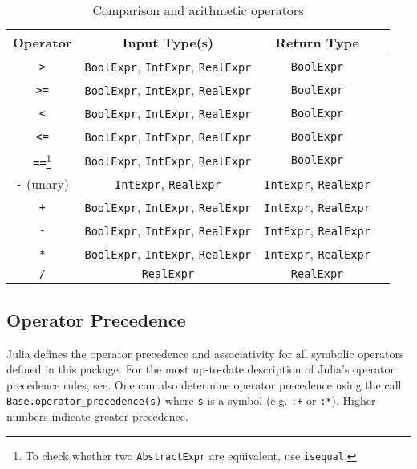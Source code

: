 \documentclass[conference]{IEEEtran}
\begin{document}
\begin{table}[h!]
	\centering
	\begin{tabular}{|c|c|c|c|}
	\hline
	Operator & Input Type(s) & Return Type\\
	\hline
	\verb|>| & \verb|BoolExpr|, \verb|IntExpr|, \verb|RealExpr|& \verb|BoolExpr| \\
	\hline
	\verb|>=| & \verb|BoolExpr|, \verb|IntExpr|, \verb|RealExpr|& \verb|BoolExpr| \\
	\hline
	\verb|<| & \verb|BoolExpr|, \verb|IntExpr|, \verb|RealExpr|& \verb|BoolExpr| \\
	\hline
	\verb|<=| & \verb|BoolExpr|, \verb|IntExpr|, \verb|RealExpr|& \verb|BoolExpr| \\
	\hline
	\verb|==|\footnote{To check whether two \texttt{AbstractExpr} are equivalent, use \texttt{isequal}.}
	& \verb|BoolExpr|, \verb|IntExpr|, \verb|RealExpr|& \verb|BoolExpr| \\
	\hline
	\verb|-| (unary) & \verb|IntExpr|, \verb|RealExpr| & \verb|IntExpr|, \verb|RealExpr|\\
	\hline
	\verb|+| & \verb|BoolExpr|, \verb|IntExpr|, \verb|RealExpr|& \verb|IntExpr|, \verb|RealExpr| \\
	\hline
	\verb|-| & \verb|BoolExpr|, \verb|IntExpr|, \verb|RealExpr|& \verb|IntExpr|, \verb|RealExpr| \\
	\hline
	\verb|*| & \verb|BoolExpr|, \verb|IntExpr|, \verb|RealExpr|& \verb|IntExpr|, \verb|RealExpr| \\
	\hline
	\verb|/| & \verb|RealExpr|& \verb|RealExpr| \\
	\hline
\end{tabular}
\label{tab:arithmetic_ops}
\caption{Comparison and arithmetic operators}
\end{table}

\subsection{Operator Precedence}
Julia defines the operator precedence and associativity for all symbolic operators defined in this package.
For the most up-to-date description of Julia's operator precedence rules, see. %
One can also determine operator precedence using the call \verb|Base.operator_precedence(s)| where \verb|s| is a symbol (e.g. \verb|:+| or \verb|:*|). Higher numbers indicate greater precedence.
\end{document}
